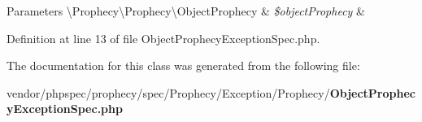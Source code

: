 \begin{DoxyParams}[1]{Parameters}
\textbackslash{}\+Prophecy\textbackslash{}\+Prophecy\textbackslash{}\+Object\+Prophecy & {\em \$object\+Prophecy} & \\
\hline
\end{DoxyParams}


Definition at line 13 of file Object\+Prophecy\+Exception\+Spec.\+php.



The documentation for this class was generated from the following file\+:\begin{DoxyCompactItemize}
\item 
vendor/phpspec/prophecy/spec/\+Prophecy/\+Exception/\+Prophecy/{\bf Object\+Prophecy\+Exception\+Spec.\+php}\end{DoxyCompactItemize}
